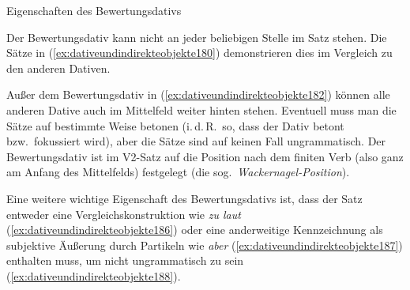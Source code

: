 \begin{Vertiefung}{Eigenschaften des Bewertungsdativs}

  \label{vert:djwackernagel}

\noindent Der Bewertungsdativ kann nicht an jeder beliebigen Stelle im Satz stehen.
Die Sätze in (\ref{ex:dativeundindirekteobjekte180}) demonstrieren dies im Vergleich zu den anderen Dativen.

\begin{exe}
  \ex\label{ex:dativeundindirekteobjekte180}
  \begin{xlist}
  \end{xlist}
\end{exe}

Außer dem Bewertungsdativ in (\ref{ex:dativeundindirekteobjekte182}) können alle anderen Dative auch im Mittelfeld weiter hinten stehen.
Eventuell muss man die Sätze auf bestimmte Weise betonen (i.\,d.\,R.\ so, dass der Dativ betont bzw.\ fokussiert wird), aber die Sätze sind auf keinen Fall ungrammatisch.
Der Bewertungsdativ ist im V2-Satz auf die Position nach dem finiten Verb (also ganz am Anfang des Mittelfelds) festgelegt (die sog.\ \textit{Wackernagel-Position}).

Eine weitere wichtige Eigenschaft des Bewertungsdativs ist, dass der Satz entweder eine Vergleichskonstruktion wie \textit{zu laut} (\ref{ex:dativeundindirekteobjekte186}) oder eine anderweitige Kennzeichnung als subjektive Äußerung durch Partikeln wie \textit{aber} (\ref{ex:dativeundindirekteobjekte187}) enthalten muss, um nicht ungrammatisch zu sein (\ref{ex:dativeundindirekteobjekte188}).

\begin{exe}
  \ex\label{ex:dativeundindirekteobjekte185}
  \begin{xlist}
  \end{xlist}
\end{exe}

\end{Vertiefung}

